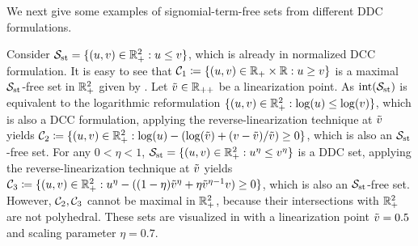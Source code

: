 We next give some examples of signomial-term-free sets from different DDC formulations.

\begin{example}
\label{sec.idealandnonideal}
Consider $
   \mathcal S_{\mathrm{st}} =\{(u, v) \in \mathbb R^2_{+}: u \le v\}$, which is already in normalized DCC formulation.
It is easy to see that $
   \mathcal C_1 \coloneqq\{(u, v) \in \mathbb R_{+} \times \mathbb R: u \ge v\}$ is a maximal $ \mathcal S_{\mathrm{st}}$-free set in $\mathbb R^2_{+}$ given by . Let $\tilde{v} \in \mathbb R_{++}$ be a linearization point.
As $ \operatorname{int}(\mathcal S_{\mathrm{st}})$ is equivalent to the logarithmic reformulation $\{(u, v) \in \mathbb R^2_{+}: \log(u) \le \log(v)\}$, which is also a DCC formulation,  applying the reverse-linearization technique at $\tilde{v}$ yields $ \mathcal C_2 \coloneqq\{(u, v) \in \mathbb R^2_{+}: \log(u) - (\log(\tilde{v}) + (v - \tilde{v}) / \tilde{v}) \ge 0\}$, which is also an  $ \mathcal S_{\mathrm{st}}$-free set. For any $0 < \eta < 1$, $\mathcal S_{\mathrm{st}} =\{(u, v) \in \mathbb R^2_{+}: u^{\eta} \le  v^\eta\}$ is a DDC set, applying the reverse-linearization technique at $\tilde{v}$ yields $ \mathcal C_3 \coloneqq\{(u, v) \in \mathbb R^2_{+}: u^{\eta} - ((1- \eta)\tilde{v}^{\eta} + \eta \tilde{v}^{\eta - 1}v)  \ge 0\}$, which is also an  $ \mathcal S_{\mathrm{st}}$-free set. However, $\mathcal C_2,\mathcal C_3$ cannot be maximal in $\mathbb R^2_{+}$, because their intersections with $\mathbb R^2_{+}$ are not  polyhedral. These sets are visualized in  with a linearization point $\tilde{v} = 0.5$ and scaling parameter $\eta= 0.7$.
\end{example}
